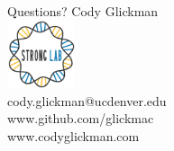 \documentclass[11pt, xcolor=table]{beamer}
\begin{document}
	
	\begin{frame}{Questions?}
	\center
	Cody Glickman \\ \includegraphics[height=2cm, width=2cm]{lablogo.png} \\ cody.glickman@ucdenver.edu \\ \alert{www.github.com/glickmac} \\ www.codyglickman.com
	\end{frame}
	
	
	
\end{document}
